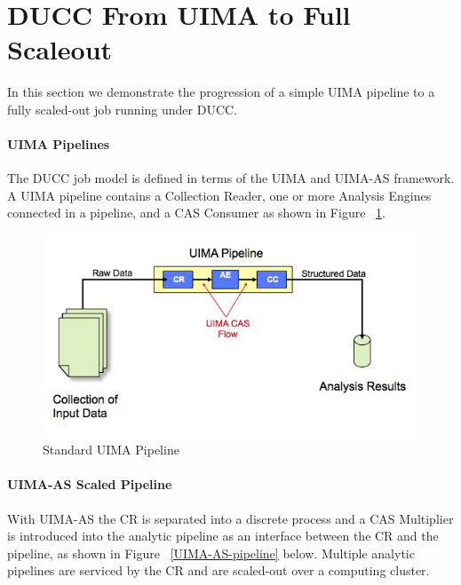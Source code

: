     \section{DUCC From UIMA to Full Scaleout}

    In this section we demonstrate the progression of a simple UIMA pipeline to a fully
    scaled-out job running under DUCC.

    \paragraph{UIMA Pipelines}
    The DUCC job model is defined in terms of the UIMA and UIMA-AS framework. A UIMA pipeline
    contains a Collection Reader, one or more Analysis Engines connected in a pipeline, and a CAS
    Consumer as shown in Figure ~\ref{UIMA-pipeline}.

    \begin{figure}[H]
      \centering
      \includegraphics[bb=0 0 575 310, width=5.5in]{images/uima-pipeline.jpg}
      \caption{Standard UIMA Pipeline}
      \label{UIMA-pipeline}
    \end{figure}

    \paragraph{UIMA-AS  Scaled Pipeline}
    With UIMA-AS the CR is separated into a discrete process and a CAS Multiplier is introduced 
    into the analytic pipeline as an interface between the CR and the pipeline, as shown in Figure
    ~\ref{UIMA-AS-pipeline} below.
    Multiple analytic pipelines are serviced by the 
    CR and are scaled-out over a computing cluster. 

